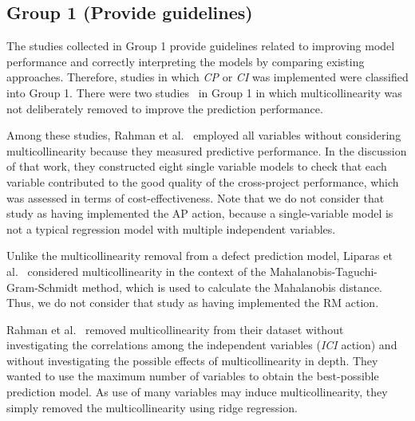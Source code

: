 \subsection{Group 1 (Provide guidelines)} 
The studies collected in Group 1 provide guidelines related to improving model performance and correctly interpreting the models by comparing existing approaches. Therefore, studies in which \textit{CP} or \textit{CI} was implemented were classified into Group 1.
There were two studies~\cite{Rahman2012FSERecalling, Rahman2014ICSEpredictionfinder} in Group 1 in which multicollinearity was not deliberately removed to improve the prediction performance. 

Among these studies, Rahman et al.~\cite{Rahman2012FSERecalling} employed all variables without considering multicollinearity because they measured predictive performance. In the discussion of that work, they constructed eight single variable models to check that each variable contributed to the good quality of the cross-project performance, which was assessed in terms of cost-effectiveness. Note that we do not consider that study as having implemented the AP action, because a single-variable model is not a typical regression model with multiple independent variables.    



Unlike the multicollinearity removal from a defect prediction model, Liparas et al.~\cite{Liparas2012ASEJournalMahalanobis} considered multicollinearity in the context of the Mahalanobis-Taguchi-Gram-Schmidt method, which is used to calculate the Mahalanobis distance. Thus, we do not consider that study as having implemented the RM action.

Rahman et al.~\cite{Rahman2013FSEbias} removed multicollinearity from their dataset without investigating the correlations among the independent variables (\textit{ICI} action) and without investigating the possible effects of multicollinearity in depth. They wanted to use the maximum number of variables to obtain the best-possible prediction model. As use of many variables may induce multicollinearity, they simply removed the multicollinearity using ridge regression.

